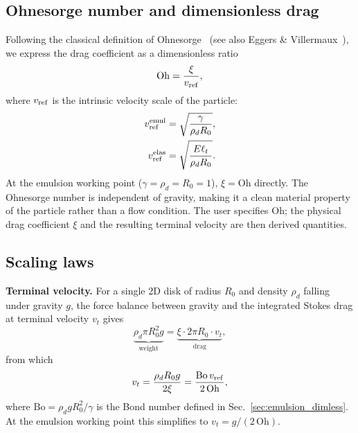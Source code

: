 \documentclass[aps,pre,twocolumn,floatfix,longbibliography]{revtex4-2}
\begin{document}
\subsection{Ohnesorge number and dimensionless drag}
\label{sec:drag_oh}

Following the classical definition of Ohnesorge~\cite{Ohnesorge1936} (see also
Eggers \& Villermaux~\cite{EggersVillermaux2008}), we express the drag coefficient
as a dimensionless ratio
\begin{equation}
  \mathrm{Oh} = \frac{\xi}{v_{\rm ref}},
  \label{eq:Oh_def}
\end{equation}
where $v_{\rm ref}$ is the intrinsic velocity scale of the particle:
\begin{align}
  v_{\rm ref}^{\rm emul} &= \sqrt{\frac{\gamma}{\rho_d R_0}},
  \label{eq:vref_emul} \\
  v_{\rm ref}^{\rm elas} &= \sqrt{\frac{E\ell_t}{\rho_d R_0}}.
  \label{eq:vref_elas}
\end{align}
At the emulsion working point ($\gamma = \rho_d = R_0 = 1$), $\xi = \mathrm{Oh}$
directly.  The Ohnesorge number is independent of gravity, making it a clean
material property of the particle rather than a flow condition.  The user specifies
$\mathrm{Oh}$; the physical drag coefficient $\xi$ and the resulting terminal velocity
are then derived quantities.

\subsection{Scaling laws}
\label{sec:drag_scaling}

\textbf{Terminal velocity.}  For a single 2D disk of radius $R_0$ and density
$\rho_d$ falling under gravity $g$, the force balance between gravity and the
integrated Stokes drag at terminal velocity $v_t$ gives
\begin{equation}
  \underbrace{\rho_d \pi R_0^2 g}_{\text{weight}} =
  \underbrace{\xi\cdot 2\pi R_0\cdot v_t}_{\text{drag}},
\end{equation}
from which
\begin{equation}
  v_t = \frac{\rho_d R_0 g}{2\xi}
       = \frac{\mathrm{Bo}\, v_{\rm ref}}{2\,\mathrm{Oh}},
  \label{eq:vt}
\end{equation}
where $\mathrm{Bo} = \rho_d g R_0^2 / \gamma$ is the Bond number defined in
Sec.~\ref{sec:emulsion_dimless}.  At the emulsion working point this
simplifies to $v_t = g/(2\,\mathrm{Oh})$.
\end{document}
